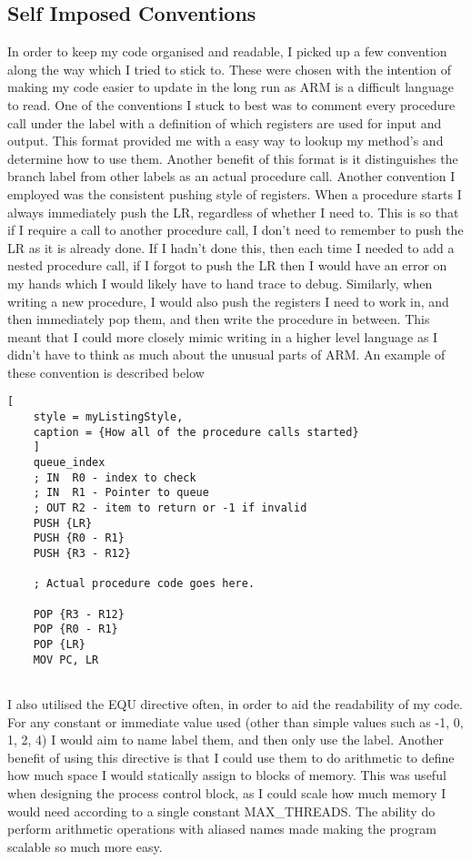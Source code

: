 \subsection{Self Imposed Conventions}
In order to keep my code organised and readable, I picked up a few convention along the way which I tried to stick to. These were chosen with the intention of making my code easier to update in the long run as ARM is a difficult language to read. One of the conventions I stuck to best was to comment every procedure call under the label with a definition of which registers are used for input and output. This format provided me with a easy way to lookup my method's and determine how to use them. Another benefit of this format is it distinguishes the branch label from other labels as an actual procedure call. Another convention I employed was the consistent pushing style of registers. When a procedure starts I always immediately push the LR, regardless of whether I need to. This is so that if I require a call to another procedure call, I don't need to remember to push the LR as it is already done. If I hadn't done this, then each time I needed to add a nested procedure call, if I forgot to push the LR then I would have an error on my hands which I would likely have to hand trace to debug. Similarly, when writing a new procedure, I would also push the registers I need to work in, and then immediately pop them, and then write the procedure in between. This meant that I could more closely mimic writing in a higher level language as I didn't have to think as much about the unusual parts of ARM. An example of these convention is described below
\pagebreak
\begin{lstlisting}[
	style = myListingStyle,
	caption = {How all of the procedure calls started}
	]
	queue_index
	; IN  R0 - index to check
	; IN  R1 - Pointer to queue
	; OUT R2 - item to return or -1 if invalid
	PUSH {LR}
	PUSH {R0 - R1}
	PUSH {R3 - R12}
	
	; Actual procedure code goes here.	
	
	POP {R3 - R12}
	POP {R0 - R1}
	POP {LR}
	MOV PC, LR
	
\end{lstlisting}
I also utilised the EQU directive often, in order to aid the readability of my code. For any constant or immediate value used (other than simple values such as -1, 0, 1, 2, 4) I would aim to name label them, and then only use the label. Another benefit of using this directive is that I could use them to do arithmetic to define how much space I would statically assign to blocks of memory. This was useful when designing the process control block, as I could scale how much memory I would need according to a single constant MAX\_THREADS. The ability do perform arithmetic operations with aliased names made making the program scalable so much more easy. 
